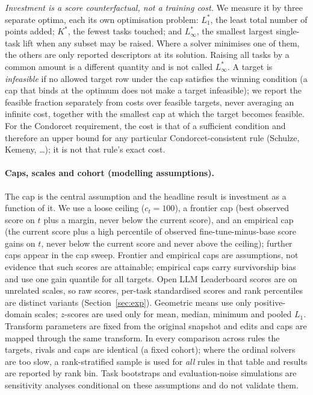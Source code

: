 \emph{Investment is a score counterfactual, not a training cost.}
We measure it by three separate optima, each its own optimisation problem: $L_1^\ast$, the least total number of points added; $K^\ast$, the fewest tasks touched; and $L_\infty^\ast$, the smallest largest single-task lift when any subset may be raised.
Where a solver minimises one of them, the others are only reported descriptors at its solution.
Raising all tasks by a common amount is a different quantity and is not called $L_\infty^\ast$.
A target is \emph{infeasible} if no allowed target row under the cap satisfies the winning condition (a cap that binds at the optimum does not make a target infeasible); we report the feasible fraction separately from costs over feasible targets, never averaging an infinite cost, together with the smallest cap at which the target becomes feasible.
For the Condorcet requirement, the cost is that of a sufficient condition and therefore an upper bound for any particular Condorcet-consistent rule (Schulze, Kemeny, \dots); it is not that rule's exact cost.

\paragraph{Caps, scales and cohort (modelling assumptions).}
The cap is the central assumption and the headline result is investment as a function of it.
We use a loose ceiling ($c_t=100$), a frontier cap (best observed score on $t$ plus a margin, never below the current score), and an empirical cap (the current score plus a high percentile of observed fine-tune-minus-base score gains on $t$, never below the current score and never above the ceiling); further caps appear in the cap sweep.
Frontier and empirical caps are assumptions, not evidence that such scores are attainable; empirical caps carry survivorship bias and use one gain quantile for all targets.
Open LLM Leaderboard scores are on unrelated scales, so raw scores, per-task standardised scores and rank percentiles are distinct variants (Section~\ref{sec:exp}).
Geometric means use only positive-domain scales; $z$-scores are used only for mean, median, minimum and pooled $L_1$.
Transform parameters are fixed from the original snapshot and edits and caps are mapped through the same transform.
In every comparison across rules the targets, rivals and caps are identical (a fixed cohort); where the ordinal solvers are too slow, a rank-stratified sample is used for \emph{all} rules in that table and results are reported by rank bin.
Task bootstraps and evaluation-noise simulations are sensitivity analyses conditional on these assumptions and do not validate them.

